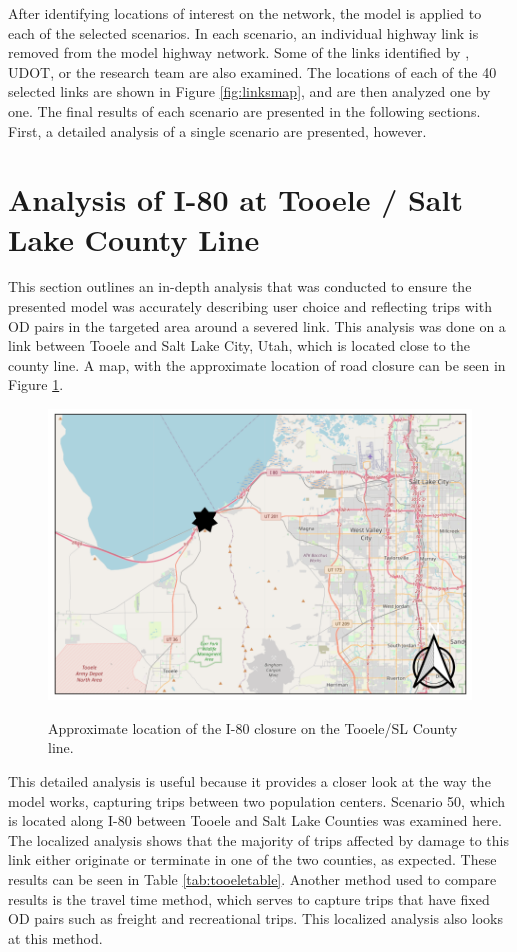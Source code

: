 After identifying locations of interest on the network, the model is applied to
each of the selected scenarios. In each scenario, an individual highway
link is removed from the model highway network. Some of the links identified
by \citeauthor{aem2017}, UDOT, or the research team are
also examined. The locations of each of the 40
selected links are shown in Figure \ref{fig:linksmap}, and are then analyzed one by one. The
final results of each scenario are presented in the following sections. First, a detailed analysis of a single
scenario are presented, however.

\section{Analysis of I-80 at Tooele / Salt Lake County Line}

This section outlines an in-depth analysis that was conducted to ensure
the presented model was accurately describing user choice and reflecting trips with OD pairs in the
targeted area around a severed link. This analysis was done on a link between
Tooele and Salt Lake City, Utah, which is located close to the county line. A map, with the approximate
location of road closure can be seen in Figure \ref{fig:tooelemapwithcone}.

\begin{figure}
  \centering
{\centering \includegraphics[width=0.85\linewidth]{figures/chapter4/tooelemapwithcone.png}
}
\caption{Approximate location of the I-80 closure on the Tooele/SL County line.}\label{fig:tooelemapwithcone}
\end{figure}

This detailed analysis is useful because it
provides a closer look at the way the model works, capturing trips
between two population centers. Scenario 50, which is located along I-80 between Tooele and Salt Lake Counties
was examined here. The localized analysis shows that the majority of trips
affected by damage to this link either originate or terminate in one of the
two counties, as expected. These results can be seen in Table
\ref{tab:tooeletable}. Another method used to compare results is
the travel time method,
which serves to capture trips that have fixed OD pairs such as freight and
recreational trips. This localized analysis also looks at this method.

